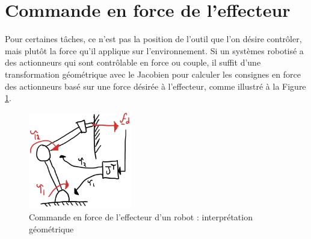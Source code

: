 \newpage
\section{Commande en force de l'effecteur}
\label{sec:forcecontrol}

Pour certaines tâches, ce n'est pas la position de l'outil que l'on désire contrôler, mais plutôt la force qu'il applique sur l'environnement. Si un systèmes robotisé a des actionneurs qui sont contrôlable en force ou couple, il suffit d'une transformation géométrique avec le Jacobien pour calculer les consignes en force des actionneurs basé sur une force désirée à l'effecteur, comme illustré à la Figure \ref{fig:forcecontroleffectorgeo}. 
\begin{figure}[H]
	\centering
		\includegraphics[width=0.4\textwidth]{fig/forcecontroleffectorgeo.jpg}
	\caption{Commande en force de l'effecteur d'un robot : interprétation géométrique}
	\label{fig:forcecontroleffectorgeo}
\end{figure}

